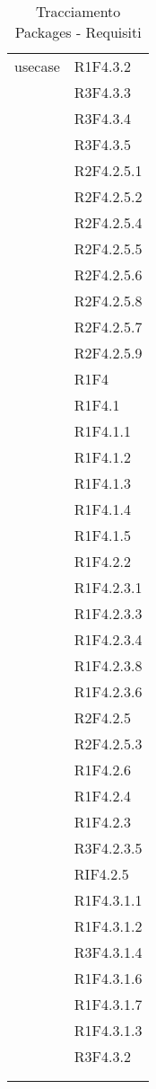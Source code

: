 \begin{center}
\begin{longtable}{|p{7cm}|p{7cm}|}
		usecase & R1F4.3.2 \\ & R3F4.3.3 \\ & R3F4.3.4 \\ & R3F4.3.5 \\ & R2F4.2.5.1 \\ & R2F4.2.5.2 \\ & R2F4.2.5.4 \\ & R2F4.2.5.5 \\ & R2F4.2.5.6 \\ & R2F4.2.5.8 \\ & R2F4.2.5.7 \\ & R2F4.2.5.9 \\ & R1F4 \\ & R1F4.1 \\ & R1F4.1.1 \\ & R1F4.1.2 \\ & R1F4.1.3 \\ & R1F4.1.4 \\ & R1F4.1.5 \\ & R1F4.2.2 \\ & R1F4.2.3.1 \\ & R1F4.2.3.3 \\ & R1F4.2.3.4 \\ & R1F4.2.3.8 \\ & R1F4.2.3.6 \\ & R2F4.2.5 \\ & R2F4.2.5.3 \\ & R1F4.2.6 \\ & R1F4.2.4 \\ & R1F4.2.3 \\ & R3F4.2.3.5 \\ & RIF4.2.5 \\ & R1F4.3.1.1 \\ & R1F4.3.1.2 \\ & R3F4.3.1.4 \\ & R1F4.3.1.6 \\ & R1F4.3.1.7 \\ & R1F4.3.1.3 \\ & R3F4.3.2 \\ & \\ \hline
	\caption[Tracciamento Packages - Requisiti]{Tracciamento Packages - Requisiti}
	\label{tabella: Tracciamento Packages - Requisiti}
	\end{longtable}
\end{center}
